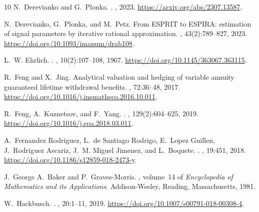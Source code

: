 \documentclass[12pt]{article}
\begin{document}
\begin{thebibliography}{10}
N.~Derevianko and G.~Plonka.
.
, 2023.
\newblock \url{https://arxiv.org/abs/2307.13587}.

N.~Derevianko, G.~Plonka, and M.~Petz.
\newblock From {ESPRIT} to {ESPIRA}: estimation of signal parameters by
  iterative rational approximation.
, 43(2):789--827, 2023.
\newblock \url{https://doi.org/10.1093/imanum/drab108}.

L.~W. Ehrlich.
.
, 10(2):107--108, 1967.
\newblock \url{https://doi.org/10.1145/363067.363115}.

R.~Feng and X.~Jing.
\newblock Analytical valuation and hedging of variable annuity guaranteed
  lifetime withdrawal benefits.
, 72:36--48, 2017.
\newblock \url{https://doi.org/10.1016/j.insmatheco.2016.10.011}.

R.~Feng, A.~Kuznetsov, and F.~Yang.
.
, 129(2):604--625,
  2019.
\newblock \url{https://doi.org/10.1016/j.spa.2018.03.011}.

A.~{Fernandez Rodriguez}, L.~{de Santiago Rodrigo}, E.~{Lopez Guillen},
  J.~{Rodriguez Ascariz}, J.~M. {Miguel Jimenez}, and L.~Boquete.
.
, 19:451, 2018.
\newblock \url{https://doi.org/10.1186/s12859-018-2473-y}.

J.~George A.~Baker and P.~Graves-Morris.
,
  volume~14 of {\em Encyclopedia of Mathematics and its Applications}.
\newblock Addison-Wesley, Reading, Massachusetts, 1981.

W.~Hackbusch.
.
, 20:1--11, 2019.
\newblock \url{https://doi.org/10.1007/s00791-018-00308-4}.


\end{thebibliography}
\end{document}
